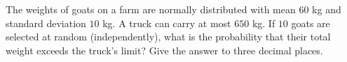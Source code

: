 The weights of goats on a farm are normally distributed with mean $60$ kg and standard deviation $10$ kg. A truck can carry at most $650$ kg. If $10$ goats are selected at random (independently), what is the probability that their total weight exceeds the truck's limit? Give the answer to three decimal places.
